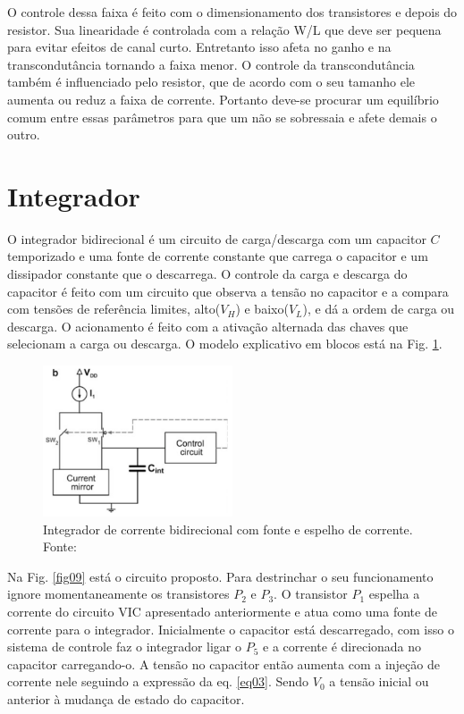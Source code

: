  O controle dessa faixa é feito com o dimensionamento dos transistores e depois do resistor. Sua linearidade é controlada com a relação W/L que deve ser pequena para evitar efeitos de canal curto. Entretanto isso afeta no ganho e na transcondutância tornando a faixa menor. O controle da transcondutância também é influenciado pelo resistor, que de acordo com o seu tamanho ele aumenta ou reduz a faixa de corrente. Portanto deve-se procurar um equilíbrio comum entre essas parâmetros para que um não se sobressaia e afete demais o outro.


\section{Integrador} 

O integrador bidirecional é um circuito de carga/descarga com um capacitor $C$ temporizado e uma fonte de corrente constante que carrega o capacitor e um dissipador constante que o descarrega. O controle da carga e descarga do capacitor é feito com um circuito que observa a tensão no capacitor e a compara com tensões de referência limites, alto($V_H$) e baixo($V_L$), e dá a ordem de carga ou descarga. O acionamento é feito com a ativação alternada das chaves que selecionam a carga ou descarga. 
O modelo explicativo em blocos está na Fig. \ref{fig08}.

\begin{figure}[htb]
	\centering
	\includegraphics[width=0.5\textwidth]{figuras/integrador_sch.png}
	\caption{Integrador de corrente bidirecional com fonte e espelho de corrente. Fonte:\cite{livroprincipal} }
	\label{fig08}
\end{figure}

Na Fig. \ref{fig09} está o circuito proposto. Para destrinchar o seu funcionamento ignore momentaneamente os transistores $P_2$ e $P_3$. O transistor $P_1$ espelha a corrente do circuito VIC apresentado anteriormente e atua como uma fonte de corrente para o integrador. 
Inicialmente o capacitor está descarregado, com isso o sistema de controle faz o integrador ligar o $P_5$ e a corrente é direcionada no capacitor carregando-o. 
A tensão no capacitor então aumenta com a injeção de corrente nele seguindo a expressão da eq. \ref{eq03}. Sendo $V_0$ a tensão inicial ou anterior à mudança de estado do capacitor.

